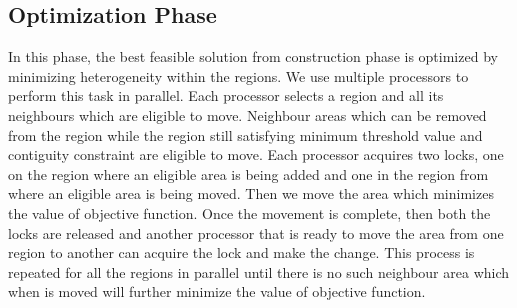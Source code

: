 \documentclass[conference]{IEEEtran}
\begin{document}
\subsection{Optimization Phase}
In this phase, the best feasible solution from construction phase is optimized
by minimizing heterogeneity within the regions. We use multiple processors to
perform this task in parallel. Each processor selects a region and all its
neighbours which are eligible to move. Neighbour areas which can be removed from
the region while the region still satisfying minimum threshold value and
contiguity constraint are eligible to move. Each processor acquires two locks,
one on the region where an eligible area is being added and one in the region from
where an eligible area is being moved. Then we move the area which minimizes the
value of objective function. Once the movement is complete, then both the locks
are released and another processor that is ready to move the area from one
region to another can acquire the lock and make the change. This process is
repeated for all the regions in parallel until there is no such neighbour area
which when is moved will further minimize the value of objective function.
\end{document}
